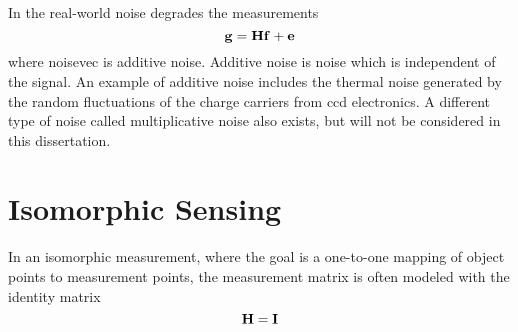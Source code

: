 In the real-world noise degrades the measurements 
\begin{equation}
	\mathbf{g}=\mathbf{Hf} + \mathbf{e}	
\end{equation}
where \gls{noisevec} is additive noise. Additive noise is noise which is independent of the signal. An example of additive noise includes the thermal noise generated by the random fluctuations of the charge carriers from \gls{ccd} electronics. A different type of noise called multiplicative noise also exists, but will not be considered in this dissertation. 

\section{Isomorphic Sensing}

In an isomorphic measurement, where the goal is a one-to-one mapping of object points to measurement points, the measurement matrix is often modeled with the identity matrix
\begin{equation}
	\mathbf{H}=\mathbf{I}	
\end{equation}


